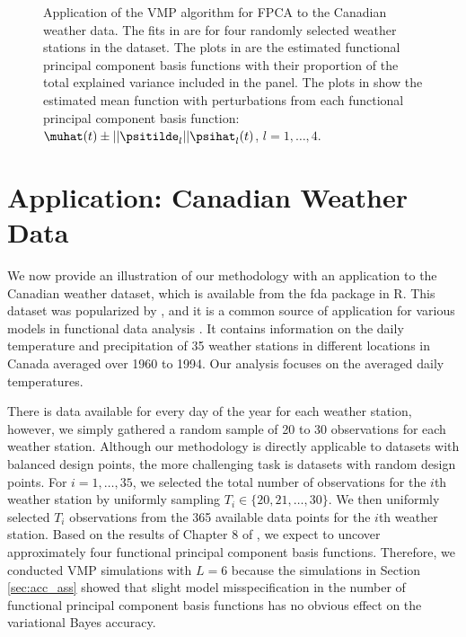 \documentclass[12pt]{article}
\theoremstyle{plain}
\theoremstyle{definition}
\theoremstyle{remark}
\begin{document}
\begin{figure}[t!]
{{\begin{subfigure}{\textwidth}
		\caption{}
		\label{subfig:cw_mean_shift}
		\end{subfigure}%
	}\cr
}
\caption{
	Application of the VMP algorithm for FPCA to the Canadian weather data. The fits in 
	are for four randomly selected weather stations in the dataset. The plots in  are the
	estimated functional principal component basis functions with their proportion of the total explained variance
	included in the panel. The plots in  show the estimated mean function with
	perturbations from each functional principal component basis function: $\muhat (t) \pm || \psitilde_l || \psihat_l (t)$,
	$l = 1, \dots, 4$.
}
\label{fig:can_weather_data}
\end{figure}


\section{Application: Canadian Weather Data}
\label{sec:can_weather_data}

We now provide an illustration of our methodology with an application to the Canadian weather dataset, which
is available from the \textsf{fda} package in \textsf{R}. This dataset was popularized by , and
it is a common source of application for various models in functional data analysis \cite{silverman95,
giraldo10, suarez17}. It contains information on the daily temperature and precipitation of 35 weather stations
in different locations in Canada averaged over 1960 to 1994. Our analysis focuses on the averaged daily
temperatures.

There is data available for every day of the year for each weather station, however, we simply gathered
a random sample of 20 to 30 observations for each weather station. Although our methodology is directly applicable
to datasets with balanced design points, the more challenging task is datasets with random design points.
For $i = 1, \dots, 35$, we selected the total number of observations for the $i$th weather station by uniformly
sampling $T_i \in \{ 20, 21, \dots, 30 \}$. We then uniformly selected $T_i$ observations from the 365 available
data points for the $i$th weather station. Based on the results of Chapter 8 of , we expect to uncover
approximately four functional principal component basis functions. Therefore, we conducted VMP simulations
with $L = 6$ because the simulations in Section \ref{sec:acc_ass} showed that slight model misspecification in the
number of functional principal component basis functions has no obvious effect on the variational Bayes accuracy.
\end{document}
